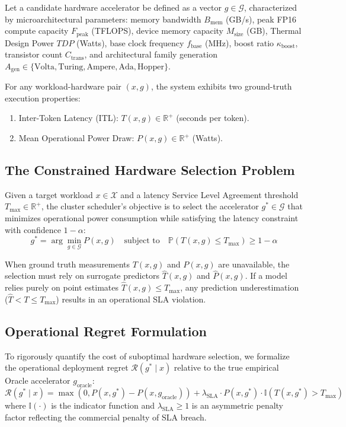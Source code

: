\documentclass[3p,12pt]{elsarticle}
\begin{document}
Let a candidate hardware accelerator be defined as a vector $g \in \mathcal{G}$, characterized by microarchitectural parameters: memory bandwidth $B_{\text{mem}}$ (GB/s), peak FP16 compute capacity $F_{\text{peak}}$ (TFLOPS), device memory capacity $M_{\text{size}}$ (GB), Thermal Design Power $TDP$ (Watts), base clock frequency $f_{\text{base}}$ (MHz), boost ratio $\kappa_{\text{boost}}$, transistor count $C_{\text{trans}}$, and architectural family generation $A_{\text{gen}} \in \{\text{Volta}, \text{Turing}, \text{Ampere}, \text{Ada}, \text{Hopper}\}$.

For any workload-hardware pair $(x, g)$, the system exhibits two ground-truth execution properties:
\begin{enumerate}
    \item Inter-Token Latency (ITL): $T(x, g) \in \mathbb{R}^+$ (seconds per token).
    \item Mean Operational Power Draw: $P(x, g) \in \mathbb{R}^+$ (Watts).
\end{enumerate}

\subsection{The Constrained Hardware Selection Problem}
Given a target workload $x \in \mathcal{X}$ and a latency Service Level Agreement threshold $T_{\max} \in \mathbb{R}^+$, the cluster scheduler's objective is to select the accelerator $g^* \in \mathcal{G}$ that minimizes operational power consumption while satisfying the latency constraint with confidence $1 - \alpha$:
\begin{equation}
\label{eq:opt_problem}
g^* = \arg\min_{g \in \mathcal{G}} P(x, g) \quad \text{subject to} \quad \mathbb{P}\left(T(x, g) \le T_{\max}\right) \ge 1 - \alpha
\end{equation}

When ground truth measurements $T(x, g)$ and $P(x, g)$ are unavailable, the selection must rely on surrogate predictors $\hat{T}(x, g)$ and $\hat{P}(x, g)$. If a model relies purely on point estimates $\hat{T}(x, g) \le T_{\max}$, any prediction underestimation ($\hat{T} < T \le T_{\max}$) results in an operational SLA violation. 

\subsection{Operational Regret Formulation}
To rigorously quantify the cost of suboptimal hardware selection, we formalize the operational deployment regret $\mathcal{R}(g^* \mid x)$ relative to the true empirical Oracle accelerator $g_{\text{oracle}}$:
\begin{equation}
\label{eq:regret}
\mathcal{R}(g^* \mid x) = \max\left(0, P(x, g^*) - P(x, g_{\text{oracle}})\right) + \lambda_{\text{SLA}} \cdot P(x, g^*) \cdot \mathbb{I}\left(T(x, g^*) > T_{\max}\right)
\end{equation}
where $\mathbb{I}(\cdot)$ is the indicator function and $\lambda_{\text{SLA}} \ge 1$ is an asymmetric penalty factor reflecting the commercial penalty of SLA breach.
\end{document}
